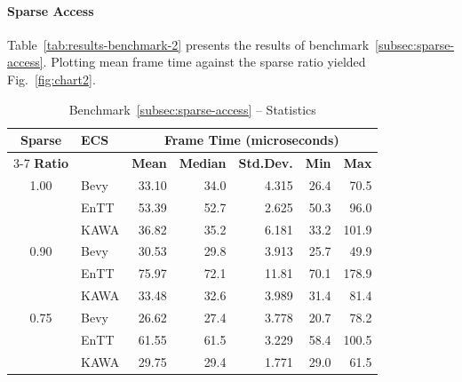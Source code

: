 \documentclass[conference]{IEEEtran}
\begin{document}
    \paragraph*{Sparse Access}Table~\ref{tab:results-benchmark-2} presents the results of benchmark~\ref{subsec:sparse-access}.
    Plotting mean frame time against the sparse ratio yielded Fig.~\ref{fig:chart2}.

    \begin{table}[htbp]
        \caption{Benchmark~\ref{subsec:sparse-access} – Statistics}
        \begin{center}
            \begin{tabular}{|c|l|r|r|r|r|r|}
                \hline
                \textbf{Sparse} & \textbf{ECS} & \multicolumn{5}{|c|}{\textbf{Frame Time (microseconds)}} \\
                \cline{3-7}
                \textbf{Ratio} & & \textbf{Mean} & \textbf{Median} & \textbf{Std.Dev.} & \textbf{Min} & \textbf{Max} \\
                \hline
                1.00 & Bevy           & 33.10         & 34.0            & 4.315             & 26.4         & 70.5         \\
                & EnTT               & 53.39         & 52.7            & 2.625             & 50.3         & 96.0         \\
                & KAWA             & 36.82         & 35.2            & 6.181             & 33.2         & 101.9        \\
                \hline
                0.90 & Bevy           & 30.53         & 29.8            & 3.913             & 25.7         & 49.9         \\
                & EnTT               & 75.97         & 72.1            & 11.81             & 70.1         & 178.9        \\
                & KAWA             & 33.48         & 32.6            & 3.989             & 31.4         & 81.4         \\
                \hline
                0.75 & Bevy           & 26.62         & 27.4            & 3.778             & 20.7         & 78.2         \\
                & EnTT               & 61.55         & 61.5            & 3.229             & 58.4         & 100.5        \\
                & KAWA             & 29.75         & 29.4            & 1.771             & 29.0         & 61.5         \\
                \hline

\end{tabular}
\end{center}
\end{table}
\end{document}
